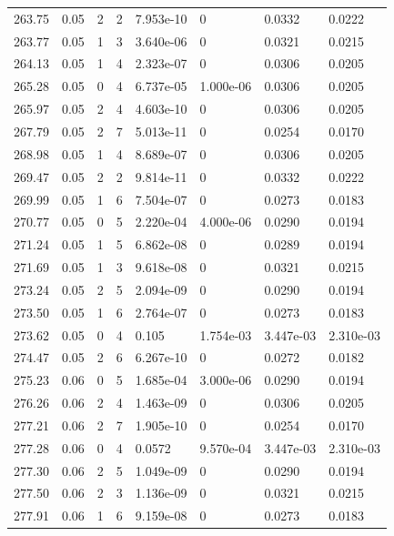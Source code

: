 \documentclass[preview]{standalone}
\begin{document}
{{{{{{{\begin{tabular}{L{1.2cm}C{1.2cm} C{0.3cm}C{0.5cm} C{1.4cm}C{1.4cm} C{1.4cm}C{1.4cm}}
  263.75  &  0.05  & 2     &  2 &  7.953e-10  & 0  & 0.0332 &  0.0222   \\ 
  263.77  &  0.05  & 1     &  3 &  3.640e-06  & 0  & 0.0321 &  0.0215   \\ 
  264.13  &  0.05  & 1     &  4 &  2.323e-07  & 0  & 0.0306 &  0.0205   \\ 
  265.28  &  0.05  & 0     &  4 &  6.737e-05  & 1.000e-06  & 0.0306 &  0.0205   \\ 
  265.97  &  0.05  & 2     &  4 &  4.603e-10  & 0  & 0.0306 &  0.0205   \\ 
  267.79  &  0.05  & 2     &  7 &  5.013e-11  & 0  & 0.0254 &  0.0170   \\ 
  268.98  &  0.05  & 1     &  4 &  8.689e-07  & 0  & 0.0306 &  0.0205   \\ 
  269.47  &  0.05  & 2     &  2 &  9.814e-11  & 0  & 0.0332 &  0.0222   \\ 
  269.99  &  0.05  & 1     &  6 &  7.504e-07  & 0  & 0.0273 &  0.0183   \\ 
  270.77  &  0.05  & 0     &  5 &  2.220e-04  & 4.000e-06  & 0.0290 &  0.0194   \\ 
  271.24  &  0.05  & 1     &  5 &  6.862e-08  & 0  & 0.0289 &  0.0194   \\ 
  271.69  &  0.05  & 1     &  3 &  9.618e-08  & 0  & 0.0321 &  0.0215   \\ 
  273.24  &  0.05  & 2     &  5 &  2.094e-09  & 0  & 0.0290 &  0.0194   \\ 
  273.50  &  0.05  & 1     &  6 &  2.764e-07  & 0  & 0.0273 &  0.0183   \\ 
  273.62  &  0.05  & 0     &  4 &  0.105  & 1.754e-03  & 3.447e-03 &  2.310e-03   \\ 
  274.47  &  0.05  & 2     &  6 &  6.267e-10  & 0  & 0.0272 &  0.0182   \\ 
  275.23  &  0.06  & 0     &  5 &  1.685e-04  & 3.000e-06  & 0.0290 &  0.0194   \\ 
  276.26  &  0.06  & 2     &  4 &  1.463e-09  & 0  & 0.0306 &  0.0205   \\ 
  277.21  &  0.06  & 2     &  7 &  1.905e-10  & 0  & 0.0254 &  0.0170   \\ 
  277.28  &  0.06  & 0     &  4 &  0.0572  & 9.570e-04  & 3.447e-03 &  2.310e-03   \\ 
  277.30  &  0.06  & 2     &  5 &  1.049e-09  & 0  & 0.0290 &  0.0194   \\ 
  277.50  &  0.06  & 2     &  3 &  1.136e-09  & 0  & 0.0321 &  0.0215   \\ 
  277.91  &  0.06  & 1     &  6 &  9.159e-08  & 0  & 0.0273 &  0.0183   \\ 

\end{tabular}}}}}}}}
\end{document}
